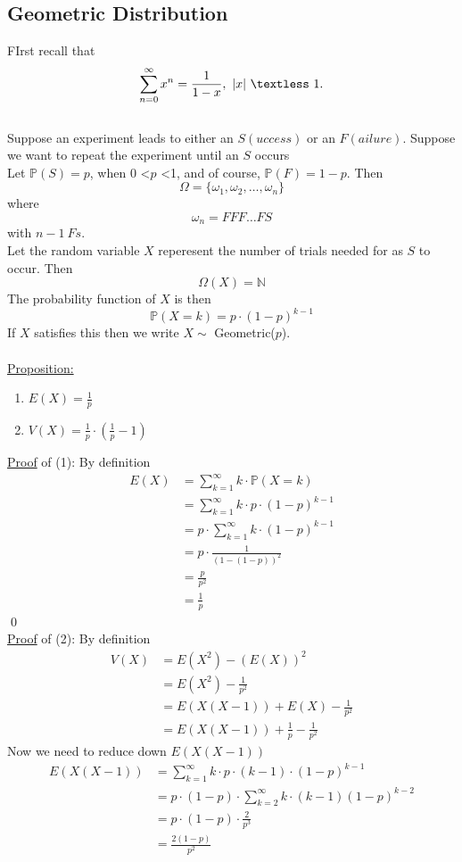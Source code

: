 \documentclass{article}
\newcommand{\N}{\mathbb{N}}
\newcommand{\bbP}{\mathbb{P}}
\newcommand{\Om}{\Omega}
\newcommand{\om}{\omega}
\newcommand{\lt}{\textless}
\newcommand{\x}{\cdot}
\begin{document}
\subsection{Geometric Distribution}
FIrst recall that
\[\sum_{n=0}^{\infty} x^{n} = \frac{1}{1-x}, \  |x|\ \lt\ 1.\]\\
Suppose an experiment leads to either an $S(uccess)$ or an $F(ailure)$. Suppose we want to repeat the experiment until an $S$ occurs\\
Let $\bbP(S) = p$, when 0 \lt $p$ \lt 1, and of course, $\bbP(F) = 1-p$. Then
\[\Om = \{\om_{1}, \om_{2}, \dots, \om_{n}\}\]
where 
\[\om_{n} = FFF\dots FS\]
with $n-1\ Fs$.\\
Let the random variable $X$ reperesent the number of trials needed for as $S$ to occur. Then
\[\Om(X) = \N\]
The probability function of $X$ is then
\[\bbP(X=k) = p\cdot (1-p)^{k-1}\]
If $X$ satisfies this then we write $X \sim$ Geometric($p$).\\\\
\underline{Proposition:}
\begin{enumerate}
	\item $E(X) = \frac{1}{p}$
	\item $V(X) = \frac{1}{p}\cdot (\frac{1}{p} - 1)$
\end{enumerate}
\underline{Proof} of (1): By definition
\begin{align*}
	E(X) &= \sum_{k=1}^{\infty} k\cdot \bbP(X=k)\\
		&= \sum_{k=1}^{\infty} k\cdot p\cdot (1-p)^{k-1}\\
		&= p\cdot \sum_{k=1}^{\infty} k\cdot (1-p)^{k-1}\\
		&= p\cdot \frac{1}{(1-(1-p))^{2}}\\
		&= \frac{p}{p^{2}}\\
		&= \frac{1}{p}
\end{align*}
\qed\\
\underline{Proof} of (2): By definition
\begin{align*}
	V(X) &= E(X^2) - (E(X))^2\\
		&= E(X^2) - \frac{1}{p^2}\\
		&= E(X(X-1)) + E(X) - \frac{1}{p^2}\\
		&= E(X(X-1)) + \frac{1}{p} - \frac{1}{p^2}
\end{align*}
Now we need to reduce down $E(X(X-1))$
\begin{align*}
	E(X(X-1)) &= \sum_{k=1}^{\infty} k\cdot p\cdot (k-1)\cdot (1-p)^{k-1}\\
			&= p\cdot (1-p)\cdot \sum_{k=2}^{\infty} k\cdot (k-1)(1-p)^{k-2}\\
			&= p\x (1-p)\x \frac{2}{p^{3}}\\
			&= \frac{2(1-p)}{p^2}
\end{align*}
\end{document}

